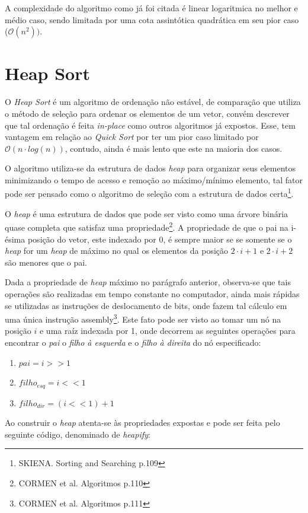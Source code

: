 \documentclass[a4paper, 12pt]{report}
\begin{document}
A complexidade do algoritmo como já foi citada é linear logaritmica no melhor
e médio caso, sendo limitada por uma cota assintótica quadrática em seu pior
caso ($\mathcal{O}(n^2))$.

\section{Heap Sort}
\label{sec-2-2-2}
O \emph{Heap Sort} é um algoritmo de ordenação não estável, de comparação que
utiliza o método de seleção para ordenar os elementos de um vetor, convém
descrever que tal ordenação é feita \emph{in-place} como outros algoritmos já
expostos. Esse, tem vantagem em relação ao \emph{Quick Sort} por ter um pior caso
limitado por $\mathcal{O}(n \cdot log{}(n))$, contudo, ainda é mais lento que
este na maioria dos casos.

O algoritmo utiliza-se da estrutura de dados \emph{heap} para organizar seus
elementos minimizando o tempo de acesso e remoção ao máximo/mínimo elemento,
tal fator pode ser pensado como o algoritmo de seleção com a estrutura de
dados certa\footnote{SKIENA. Sorting and Searching p.109}.

O \emph{heap} é uma estrutura de dados que pode ser visto como uma árvore binária
quase completa que satisfaz uma propriedade\footnote{CORMEN et al. Algoritmos p.110}. A propriedade de que o pai
na i-ésima posição do vetor, este indexado por 0, é sempre maior se se somente
se o \emph{heap} for um \emph{heap} de máximo no qual os elementos da posição
$2 \cdot i + 1$ e $2 \cdot i + 2$ são menores que o pai.

Dada a propriedade de \emph{heap} máximo no parágrafo anterior, observa-se que tais
operações são realizadas em tempo constante no computador, ainda mais rápidas
se utilizadas as instruções de deslocamento de bits, onde fazem tal cálculo
em uma única instrução assembly\footnote{CORMEN et al. Algoritmos p.111}. Este fato pode ser visto ao tomar um
nó na posição $i$ e uma raíz indexada por 1, onde decorrem as seguintes
operações para encontrar o \emph{pai} o \emph{filho à esquerda} e o \emph{filho à direita} do
nó especificado:

\begin{enumerate}
\item $pai = i >> 1$
\item $filho_{esq} = i << 1$
\item $filho_{dir} = (i << 1) + 1$
\end{enumerate}

Ao construir o \emph{heap} atenta-se às propriedades expostas e pode ser feita pelo
seguinte código, denominado de \emph{heapify}:
\end{document}
